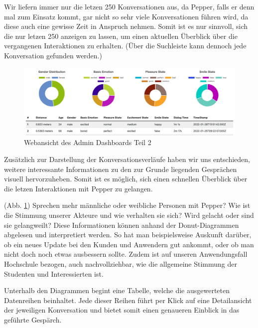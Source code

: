 Wir liefern immer nur die letzen 250 Konversationen aus, da Pepper, falls er denn
mal zum Einsatz kommt, gar nicht so sehr viele Konversationen führen wird, da diese auch eine gewisse Zeit in Anspruch nehmen.
Somit ist es nur sinnvoll, sich die nur letzen 250 anzeigen zu lassen, um einen aktuellen Überblick über die vergangenen
Interaktionen zu erhalten. (Über die Suchleiste kann dennoch jede Konversation gefunden werden.)\\


\begin{figure}[H]
    \includegraphics[width=\textwidth]{Figures/NodeChapter/adminDashboard2.png}
    \caption{Webansicht des Admin Dashboards Teil 2}
    \label{fig:admindashboard2}
    \centering
\end{figure}

Zusätzlich zur Darstellung der Konversationsverläufe haben wir uns entschieden, weitere interessante Informationen zu den zur Grunde
liegenden Gesprächen visuell hervorzuheben. Somit ist es möglich, sich einen schnellen Überblick
über die letzen Interaktionen mit Pepper zu gelangen.

(Abb. \ref{fig:admindashboard2}) Sprechen mehr männliche oder weibliche Personen
mit Pepper? Wie ist die Stimmung unserer Akteure und wie verhalten sie sich? Wird gelacht oder sind sie gelangweilt? Diese Informationen
können anhand der Donut-Diagrammen abgelesen und interpretiert werden. So hat man beispielsweise Auskunft darüber, ob ein neues
Update bei den Kunden und Anwendern gut ankommt, oder ob man nicht doch noch etwas ausbessern sollte. Zudem ist auf unseren
Anwendungsfall Hochschule bezogen, auch nachvollziehbar, wie die allgemeine Stimmung der Studenten und Interessierten ist.

Unterhalb den Diagrammen begint eine Tabelle, welche die ausgewerteten Datenreihen beinhaltet. Jede dieser Reihen
führt per Klick auf eine Detailansicht der jeweiligen Konversation und bietet somit einen genaueren Einblick in das geführte
Gespärch.

